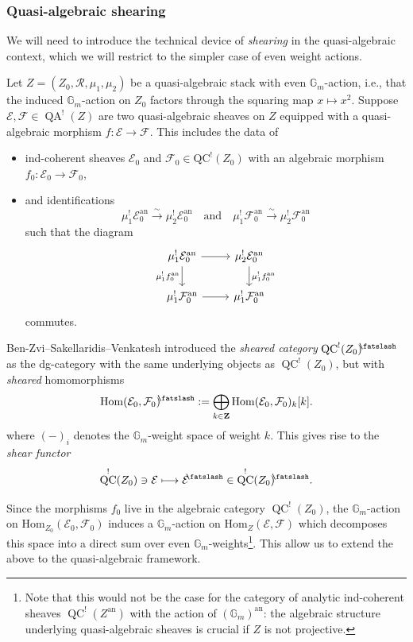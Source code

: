 \documentclass[11pt, a4paper]{amsart}
\numberwithin{equation}{section}
\theoremstyle{definition}
\theoremstyle{remark}
\DeclareMathOperator{\an}{an}
\DeclareMathOperator{\QC}{QC}
\DeclareMathOperator{\QA}{QA}
\newcommand{\shear}{{\mathbin{\mkern-6mu\fatslash}}}
\newcommand{\Ee}{\mathcal{E}}
\newcommand{\Ff}{\mathcal{F}}
\newcommand{\Rr}{\mathcal{R}}
\newcommand{\GG}{\mathbb{G}}
\renewcommand{\to}{\longrightarrow}
\begin{document}
\subsubsection{Quasi-algebraic shearing} We will need to introduce the technical device of \textit{shearing} \cite[Section 6]{BZSV} in the quasi-algebraic context, which we will restrict to the simpler case of even weight actions. 



Let $Z = (Z_0, \Rr, \mu_1, \mu_2)$ be a quasi-algebraic stack with even $\GG_m$-action, i.e., that the induced $\GG_m$-action on $Z_0$ factors through the squaring map $x \mapsto x^2$. Suppose $\Ee, \Ff \in \QA^!(Z)$ are two quasi-algebraic sheaves on $Z$ equipped with a quasi-algebraic morphism $f :\Ee \to \Ff$. This includes the data of
\begin{itemize}
    \item ind-coherent sheaves $\Ee_0$ and $\Ff_0 \in \mathrm{QC}^!(Z_0)$ with an algebraic morphism $f_0: \Ee_0 \to \Ff_0$,
    \item and identifications
    \[
    \mu_1^!\Ee^{\an}_0 \overset{\sim}{\to} \mu_2^! \Ee^{\an}_0  \quad \text{and} \quad \mu_1^!\Ff^{\an}_0 \overset{\sim}{\to} \mu_2^! \Ff^{\an}_0
    \]
    such that the diagram
    \begin{equation}
        \begin{tikzcd}
	{\mu_1^!\Ee^{\an}_0} & {\mu_2^!\Ee^{\an}_0} \\
	{\mu_1^!\Ff^{\an}_0} & {\mu_1^!\Ff^{\an}_0}
	\arrow[from=1-1, to=1-2]
	\arrow["{\mu_1^!f^{\an}_0}"', from=1-1, to=2-1]
	\arrow["{\mu_1^!f^{\an}_0}", from=1-2, to=2-2]
	\arrow[from=2-1, to=2-2]
\end{tikzcd}
    \end{equation}
    commutes. 
\end{itemize}

Ben-Zvi--Sakellaridis--Venkatesh introduced the \textit{sheared category} $\QC^!(Z_0)^\shear$ as the dg-category with the same underlying objects as $\QC^!(Z_0)$, but with {\it sheared} homomorphisms \cite[Section 6.1]{BZSV}
\[%
    \mathrm{Hom}(\Ee_0,\Ff_0)^\shear := \bigoplus_{k \in \mathbf{Z}} \mathrm{Hom}(\Ee_0,\Ff_0)_k[k].
\]%
where $(-)_i$ denotes the $\GG_m$-weight space of weight $k$. This gives rise to the {\it shear functor}
\[
\QC^!(Z_0) \ni \Ee \longmapsto \Ee^\shear \in \QC^!(Z_0)^\shear.
\]

Since the morphisms $f_0$ live in the algebraic category $\QC^!(Z_0)$, the $\GG_m$-action on $\mathrm{Hom}_{Z_0}(\Ee_0,\Ff_0)$ induces a $\GG_m$-action on $\mathrm{Hom}_Z(\Ee,\Ff)$ which decomposes this space into a direct sum over even $\GG_m$-weights\footnote{Note that this would not be the case for the category of analytic ind-coherent sheaves $\QC^!(Z^{\an})$ with the action of $(\GG_m)^{\an}$: the algebraic structure underlying quasi-algebraic sheaves is crucial if $Z$ is not projective.}. This allow us to extend the above to the quasi-algebraic framework. 
\end{document}
